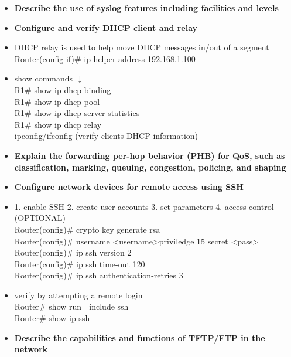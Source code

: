 \documentclass{article}
\begin{document}
\begin{itemize}
  \item \textbf{Describe the use of syslog features including facilities and levels}
  \item \textbf{Configure and verify DHCP client and relay}
  	\item[] DHCP relay is used to help move DHCP messages in/out of a segment\\
		Router(config-if)\# ip helper-address 192.168.1.100
	\item[] show commands $\downarrow$\\
		R1\# show ip dhcp binding\\
		R1\# show ip dhcp pool\\
		R1\# show ip dhcp server statistics\\
		R1\# show ip dhcp relay\\
		ipconfig/ifconfig (verify clients DHCP information)
  \item \textbf{Explain the forwarding per-hop behavior (PHB) for QoS, such as classification, marking, queuing, congestion, policing, and shaping}
  \item \textbf{Configure network devices for remote access using SSH}
  	\item[] 1. enable SSH 2. create user accounts 3. set parameters 4. access control (OPTIONAL)\\
		Router(config)\# crypto key generate rsa\\
		Router(config)\# username \textless username\textgreater priviledge 15 secret \textless pass\textgreater\\
		Router(config)\# ip ssh version 2\\
		Router(config)\# ip ssh time-out 120\\
		Router(config)\# ip ssh authentication-retries 3
	\item[] verify by attempting a remote login\\
		Router\# show run | include ssh\\
		Router\# show ip ssh
  \item \textbf{Describe the capabilities and functions of TFTP/FTP in the network}
\end{itemize}
\end{document}
